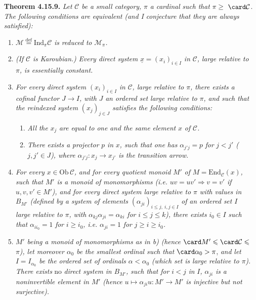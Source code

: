 \textbf{Theorem 4.15.9.} \textit{Let $\mathcal{C}$ be a small category, $\pi$ a cardinal such that $\pi \geqslant$} $\card\mathcal{C}$. \textit{The following conditions are equivalent (and I conjecture that they are always satisfied):}
\begin{enumerate}[nosep]
\item[\textit{a)}] \textit{$\mathcal{M} \overset{\text{def}}{=} \mathrm{Ind}_\pi\mathcal{C}$ is reduced to $\mathcal{M}_\pi$.}
\item[\textit{a$'$)}] \textit{(If $\mathcal{C}$ is Karoubian.) Every direct system $\underline{x} = (x_i)_{i\in I}$ in $\mathcal{C}$, large relative to $\pi$, is essentially constant.}
\item[\textit{a$''$)}] \textit{For every direct system $(x_i)_{i\in I}$ in $\mathcal{C}$, large relative to $\pi$, there exists a cofinal functor $J \longrightarrow I$, with $J$ an ordered set large relative to $\pi$, and such that the reindexed system $(x_j)_{j\in J}$ satisfies the following conditions:}
\begin{enumerate}[nosep]
\item[\textit{1)}] \textit{All the $x_j$ are equal to one and the same element $x$ of $\mathcal{C}$.}
\item[\textit{2)}] \textit{There exists a projector $p$ in $x$, such that one has $\alpha_{j'j} = p$ for $j < j'$ ($j,j' \in J$), where $\alpha_{j'j} : x_j \longrightarrow x_{j'}$ is the transition arrow.}
\end{enumerate}
\item[\textit{b)}] \textit{For every $x \in \mathrm{Ob}\,\mathcal{C}$, and for every quotient monoid $M'$ of $M = \mathrm{End}_{\mathcal{C}}(x)$, such that $M'$ is a monoid of monomorphisms (i.e. $uv = uv' \Longrightarrow v = v'$ if $u,v,v' \in M'$), and for every direct system large relative to $\pi$ with values in $B_{M'}$ (defined by a system of elements $(\alpha_{ji})_{i\leqslant j,\ i,j\in I}$ of an ordered set $I$ large relative to $\pi$, with $\alpha_{kj}\alpha_{ji} = \alpha_{ki}$ for $i \leqslant j \leqslant k$), there exists $i_0 \in I$ such}
\textit{that $\alpha_{ii_0} = 1$ for $i \geqslant i_0$, i.e. $\alpha_{ji} = 1$ for $j \geqslant i \geqslant i_0$.}
\item[\textit{b$'$)}] \textit{$M'$ being a monoid of monomorphisms as in b) (hence} $\card M' \leqslant \card\mathcal{C} \leqslant$ \textit{$\pi$), let moreover $\alpha_0$ be the smallest ordinal such that} $\card\alpha_0 > \pi$, \textit{and let $I = I_{\alpha_0}$ be the ordered set of ordinals $\alpha < \alpha_0$ (which set is large relative to $\pi$). There exists} no \textit{direct system in $B_{M'}$, such that for $i < j$ in $I$, $\alpha_{ji}$ is a noninvertible element in $M'$ (hence $u \longmapsto \alpha_{ji}u : M' \longrightarrow M'$ is injective but not surjective).}
\end{enumerate}